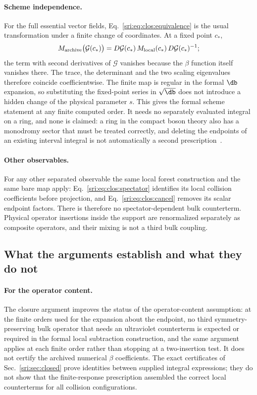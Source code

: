 \paragraph{Scheme independence.} For the full essential vector fields, Eq.~\eqref{sri:eq:clos:equivalence} is the usual
transformation under a finite change of coordinates. At a fixed point $c_*$,
\begin{equation}
 M_{\rm archive}\bigl(\mathcal G(c_*)\bigr)=D\mathcal G(c_*)\,M_{\rm local}(c_*)\,D\mathcal G(c_*)^{-1};
\end{equation}
the term with second derivatives of $\mathcal G$ vanishes because the $\beta$ function itself vanishes there. The
trace, the determinant and the two scaling eigenvalues therefore coincide coefficientwise. The finite map is regular in
the formal $\db$ expansion, so substituting the fixed-point series in $\sqrt{\db}$ does not introduce a hidden change of
the physical parameter $s$. This gives the formal scheme statement at any finite computed order. It needs no separately
evaluated integral on a ring, and none is claimed: a ring in the compact boson theory also has a monodromy sector that
must be treated correctly, and deleting the endpoints of an existing interval integral is not automatically a second
prescription~\cite{sri:Benedetti:2025nzp}.

\paragraph{Other observables.} For any other separated observable the same local forest construction and the same bare
map apply: Eq.~\eqref{sri:eq:clos:spectator} identifies its local collision coefficients before projection, and
Eq.~\eqref{sri:eq:clos:cancel} removes its scalar endpoint factors. There is therefore no spectator-dependent bulk
counterterm. Physical operator insertions inside the support are renormalized separately as composite operators, and
their mixing is not a third bulk coupling.

\subsection{What the arguments establish and what they do not}\label{sri:app:clos:scope}
\paragraph{For the operator content.} The closure argument improves the status of the operator-content assumption: at
the finite orders used for the expansion about the endpoint, no third symmetry-preserving bulk operator that needs an
ultraviolet counterterm is expected or required in the formal local subtraction construction, and the same argument
applies at each finite order rather than stopping at a two-insertion test. It does not certify the archived numerical
$\beta$ coefficients. The exact certificates of Sec.~\ref{sri:sec:closed} prove identities between supplied integral
expressions; they do not show that the finite-response prescription assembled the correct local counterterms for all
collision configurations.

